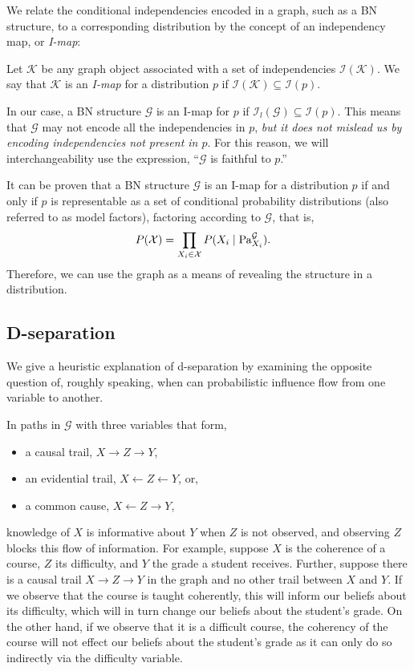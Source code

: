 \documentclass{article}
\begin{document}
We relate the conditional independencies encoded in a graph, such as a BN structure, to a corresponding distribution by the concept of an independency map, or \emph{I-map}:
\begin{definition}
	Let $\mathcal{K}$ be any graph object associated with a set of independencies $\mathcal{I}(\mathcal{K})$.
We say that $\mathcal{K}$ is an \emph{I-map} for a distribution $p$ if $\mathcal{I}(\mathcal{K})\subseteq\mathcal{I}(p)$.
\end{definition}
In our case, a BN structure $\mathcal{G}$ is an I-map for $p$ if $\mathcal{I}_l(\mathcal{G})\subseteq\mathcal{I}(p)$.
This means that $\mathcal{G}$ may not encode all the independencies in $p$, \emph{but it does not mislead us by encoding independencies not present in $p$}.
For this reason, we will interchangeability use the expression, ``$\mathcal{G}$ is faithful to $p$.''

It can be proven that a BN structure $\mathcal{G}$ is an I-map for a distribution $p$ if and only if $p$ is representable as a set of conditional probability distributions (also referred to as model factors), factoring according to $\mathcal{G}$, that is,
\begin{align*}
	P(\mathcal{X}) &= \prod_{X_i\in\mathcal{X}}P(X_i\mid\textnormal{Pa}^\mathcal{G}_{X_i}).
\end{align*}
Therefore, we can use the graph as a means of revealing the structure in a distribution.

\subsection{D-separation}
\label{sec:d-separation}
We give a heuristic explanation of d-separation by examining the opposite question of, roughly speaking, when can probabilistic influence flow from one variable to another.

In paths in $\mathcal{G}$ with three variables that form,
\begin{itemize}
	\item a causal trail, $X\rightarrow  Z\rightarrow Y$,
	\item an evidential trail, $X\leftarrow Z\leftarrow Y$, or,
	\item a common cause, $X\leftarrow Z\rightarrow Y$,
\end{itemize}
knowledge of $X$ is informative about $Y$ when $Z$ is not observed, and observing $Z$ blocks this flow of information.
For example, suppose $X$ is the coherence of a course, $Z$ its difficulty, and $Y$ the grade a student receives.
Further, suppose there is a causal trail $X\rightarrow  Z\rightarrow Y$ in the graph and no other trail between $X$ and $Y$.
If we observe that the course is taught coherently, this will inform our beliefs about its difficulty, which will in turn change our beliefs about the student's grade.
On the other hand, if we observe that it is a difficult course, the coherency of the course will not effect our beliefs about the student's grade as it can only do so indirectly via the difficulty variable.
\end{document}
